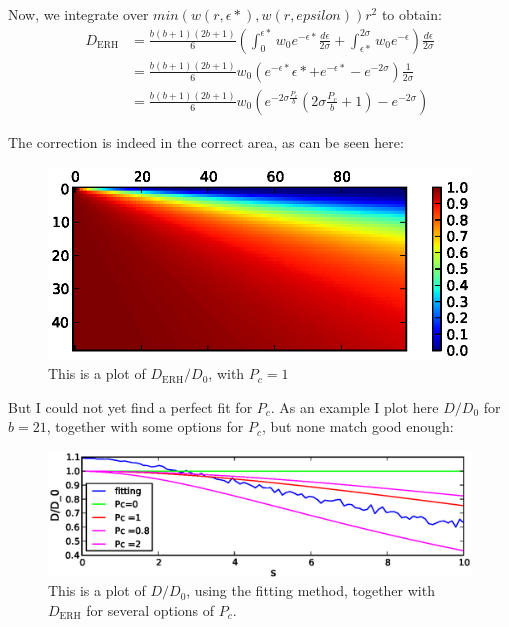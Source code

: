 \documentclass[onecolumn,fleqn,notitlepage,secnumarabic]{revtex4}
\begin{document}
Now, we integrate over $min(w(r,\epsilon*),w(r,epsilon))r^2$ to obtain:
\begin{align}
   D_\textrm{ERH} &= \frac{b(b+1)(2b+1)}{6}(\int_0^{\epsilon*}w_0e^{-\epsilon*}\frac{d\epsilon}{2\sigma} +  \int_{\epsilon*}^{2\sigma} w_0e^{-\epsilon})\frac{d\epsilon}{2\sigma} \\
   &= \frac{b(b+1)(2b+1)}{6} w_0\left(e^{-\epsilon*}\epsilon*+e^{-\epsilon*}-e^{-2\sigma}\right)\frac{1}{2\sigma}\\
   &=\frac{b(b+1)(2b+1)}{6} w_0 \left( e^{-2\sigma\frac{P_c}{b}}\left(2\sigma\frac{P_c}{b} + 1\right) - e^{-2\sigma}\right)
\end{align}

The correction is indeed in the correct area, as can be seen here:
\begin{figure}[H]
\includegraphics{BANDED_ERH}
\caption{This is a plot of $D_\textrm{ERH}/D_0$, with $P_c=1$}
\end{figure}

But I could not yet find a perfect fit for $P_c$. As an example I plot here $D/D_0$ for $b=21$, together with some options for $P_c$, but none match good enough:
\begin{figure}[H]
\includegraphics{b21}
\caption{This is a plot of $D/D_0$, using the fitting method, together with $D_\textrm{ERH}$ for several options of $P_c$.}
\end{figure}
\end{document}

